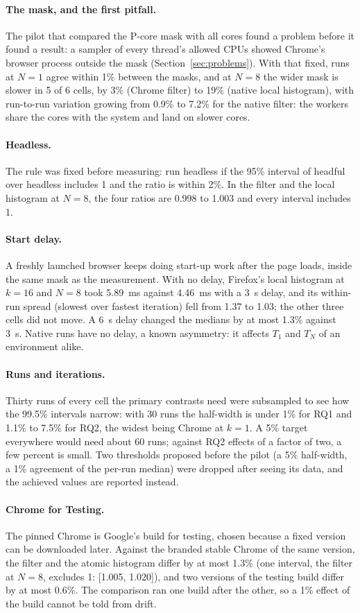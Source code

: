 \paragraph{The mask, and the first pitfall.} The pilot that compared the
P-core mask with all cores found a problem before it found a result: a
sampler of every thread's allowed CPUs showed Chrome's browser process
outside the mask (Section~\ref{sec:problems}). With that fixed, runs at
$N=1$ agree within 1\% between the masks, and at $N=8$ the wider mask is
slower in 5 of 6 cells, by 3\% (Chrome filter) to 19\% (native local
histogram), with run-to-run variation growing from 0.9\% to 7.2\% for the
native filter: the workers share the cores with the system and land on
slower cores.

\paragraph{Headless.} The rule was fixed before measuring: run headless if
the 95\% interval of headful over headless includes 1 and the ratio is
within 2\%. In the filter and the local histogram at $N=8$, the four ratios
are 0.998 to 1.003 and every interval includes 1.

\paragraph{Start delay.} A freshly launched browser keeps doing start-up
work after the page loads, inside the same mask as the measurement. With no
delay, Firefox's local histogram at $k=16$ and $N=8$ took 5.89~ms against
4.46~ms with a 3~s delay, and its within-run spread (slowest over fastest
iteration) fell from 1.37 to 1.03; the other three cells did not move. A
6~s delay changed the medians by at most 1.3\% against 3~s. Native runs
have no delay, a known asymmetry: it affects $T_1$ and $T_N$ of an
environment alike.

\paragraph{Runs and iterations.} Thirty runs of every cell the primary
contrasts need were subsampled to see how the 99.5\% intervals narrow: with
30 runs the half-width is under 1\% for RQ1 and 1.1\% to 7.5\% for RQ2, the
widest being Chrome at $k=1$. A 5\% target everywhere would need about 60
runs; against RQ2 effects of a factor of two, a few percent is small. Two
thresholds proposed before the pilot (a 5\% half-width, a 1\% agreement of
the per-run median) were dropped after seeing its data, and the achieved
values are reported instead.

\paragraph{Chrome for Testing.} The pinned Chrome is Google's build for
testing, chosen because a fixed version can be downloaded later. Against
the branded stable Chrome of the same version, the filter and the atomic
histogram differ by at most 1.3\% (one interval, the filter at $N=8$,
excludes 1: [1.005, 1.020]), and two versions of the testing build differ
by at most 0.6\%. The comparison ran one build after the other, so a 1\%
effect of the build cannot be told from drift.
